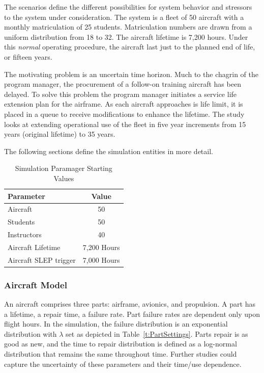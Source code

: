 \documentclass[preprint,12pt]{elsarticle}
\begin{document}
The scenarios define the different possibilities for system behavior
and stressors to the system under consideration. The system is a fleet
of 50 aircraft with a monthly matriculation of
25 students. Matriculation numbers are drawn from a uniform
distribution from 18 to 32.  The aircraft lifetime is 7,200 hours. Under this
\emph{normal} operating procedure, the  
aircraft last just to the planned end of life, or fifteen years.

The motivating problem is an uncertain time horizon. Much to the
chagrin of the program manager, the procurement of a follow-on
training aircraft has been delayed. To solve this problem the program manager
initiates a service life extension plan for the airframe. As each
aircraft approaches is life limit, it is placed in a queue to receive
modifications to enhance the lifetime. The study looks at extending
operational use of the fleet in five year increments from 15 years
(original lifetime) to 35 years.

The following sections define the simulation entities in more detail.

\begin{table}[h]
\begin{center}
    \caption{Simulation Paramager Starting Values }
  \label{t:StartingValues}
    \begin{tabular}{l c }
      \hline
      \hline
      \textbf{Parameter} & \textbf{Value} \\
      \hline
      Aircraft & 50 \\
      Students & 50 \\
      Instructors & 40 \\
      Aircraft Lifetime & 7,200 Hours \\
      Aircraft SLEP trigger & 7,000 Hours \\
      \hline
    \end{tabular}
    \end{center}
\end{table}

\subsubsection{Aircraft Model}
An aircraft comprises three parts: airframe, avionics, and
propulsion. A part has a lifetime, a repair time, a failure rate. Part
failure rates are dependent only upon flight hours. In the simulation,
the failure distribution is an exponential distribution with $\lambda$
set as depicted in Table~\ref{t:PartSettings}. Parts repair is
as good as new, and the time to repair distribution is defined as a
log-normal distribution that remains the same throughout time. Further
studies could capture the uncertainty of these parameters and their
time/use dependence. 
\end{document}
